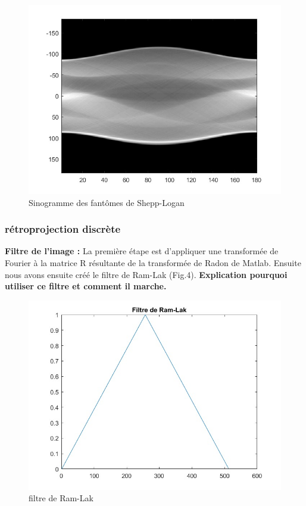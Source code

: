 \documentclass[conference]{IEEEtran}
\begin{document}
\begin{figure}[H]
\centering
\includegraphics[scale=0.5]{sinogramme}
\caption[Sinogramme des fantômes de Shepp-Logan]{Sinogramme des fantômes de Shepp-Logan}
\label{fig:gallery}
\end{figure}



\subsubsection{rétroprojection discrète }

\textbf{Filtre de l'image :} La première étape est d'appliquer une transformée de Fourier à la matrice R résultante de la transformée de Radon de Matlab. Ensuite nous avons ensuite créé le filtre de Ram-Lak (Fig.4). \textbf{Explication pourquoi utiliser ce filtre et comment il marche.}

\begin{figure}[H]
\centering
\includegraphics[scale=0.4]{filtre-de-Ram-Lak}
\caption[filtre de Ram-Lak]{filtre de Ram-Lak}
\label{fig:gallery}
\end{figure}
\end{document}

